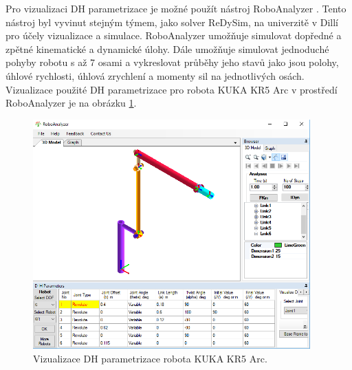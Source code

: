 Pro vizualizaci DH parametrizace je možné použít nástroj RoboAnalyzer \cite{roboanalyzer}. Tento nástroj byl vyvinut stejným týmem, jako solver ReDySim, na univerzitě v Dillí pro účely vizualizace a simulace. RoboAnalyzer umožňuje simulovat dopředné a zpětné kinematické a dynamické úlohy. Dále umožňuje simulovat jednoduché pohyby robotu s až 7 osami a vykreslovat průběhy jeho stavů jako jsou polohy, úhlové rychlosti, úhlová zrychlení a momenty sil na jednotlivých osách. Vizualizace použité DH parametrizace pro robota KUKA KR5 Arc v prostředí RoboAnalyzer je na obrázku \ref{dh_kuka_pic}.
\\
\begin{figure}[ht]
\includegraphics[width=0.95\textwidth]{pic_dh_kuka}
\caption{Vizualizace DH parametrizace robota KUKA KR5 Arc.}
\label{dh_kuka_pic}
\end{figure}

